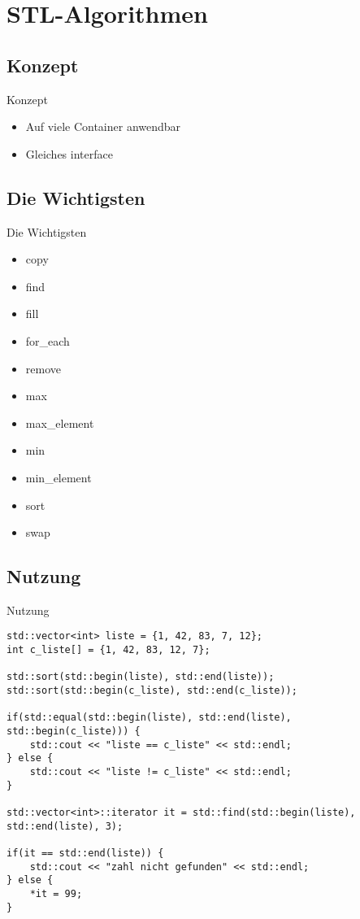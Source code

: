 \section{STL-Algorithmen}


\subsection{Konzept}

\begin{frame}{Konzept}
	\begin{itemize}
		\item Auf viele Container anwendbar
		\item Gleiches interface
	\end{itemize}
\end{frame}

\subsection{Die Wichtigsten}

\begin{frame}{Die Wichtigsten}
	\begin{itemize}
		\item copy
		\item find
		\item fill
		\item for\_each
		\item remove
		\item max
		\item max\_element
		\item min
		\item min\_element
		\item sort
		\item swap
	\end{itemize}
\end{frame}

\subsection{Nutzung}

\begin{frame}[fragile]{Nutzung}
	
	\begin{lstlisting}[escapechar=\$]
std::vector<int> liste = {1, 42, 83, 7, 12};
int c_liste[] = {1, 42, 83, 12, 7};

std::sort(std::begin(liste), std::end(liste));
std::sort(std::begin(c_liste), std::end(c_liste));

if(std::equal(std::begin(liste), std::end(liste), std::begin(c_liste))) {
    std::cout << "liste == c_liste" << std::endl;
} else {
    std::cout << "liste != c_liste" << std::endl;
}

std::vector<int>::iterator it = std::find(std::begin(liste), std::end(liste), 3);

if(it == std::end(liste)) {
    std::cout << "zahl nicht gefunden" << std::endl;
} else {
    *it = 99;
}
	\end{lstlisting}
	
\end{frame}
